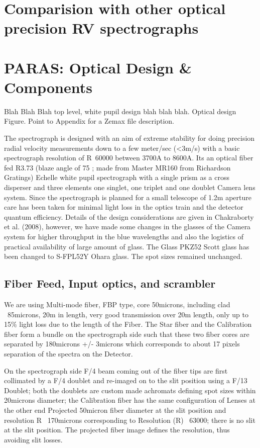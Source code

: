 \documentclass[12pt,preprint]{emulateapj}
\begin{document}
\section{Comparision with other optical precision RV spectrographs}
\section{PARAS: Optical Design \& Components}
\label{optdesign}
Blah Blah Blah top level, white pupil design blah blah blah. Optical design Figure. Point to Appendix for a Zemax file description.

The spectrograph is designed with an aim of extreme stability for doing precision radial velocity measurements
down to a few meter/sec (<3m/s) with a basic spectrograph resolution of R~60000 between 3700A to 8600A. Its an
optical fiber fed R3.73 (blaze angle of 75 ; made from Master MR160 from Richardson Gratings) Echelle white pupil
spectrograph with a single prism as a cross disperser and three elements one singlet, one triplet and one doublet
Camera lens system. Since the spectrograph is planned for a small telescope of 1.2m aperture care has been taken
for minimal light loss in the optics train and the detector quantum efficiency. Details of the design
considerations are given in Chakraborty et al. (2008), however, we have made some changes in the glasses of the
Camera system for higher throughput in the blue wavelengths and also the logistics of practical availability of
large amount of glass. The Glass PKZ52 Scott glass has been changed to S-FPL52Y Ohara glass. The spot sizes
remained unchanged.

\subsection{Fiber Feed, Input optics, and scrambler}
We are using Multi-mode fiber, FBP type, core 50microns, including clad ~85microns, 20m in length, very good
transmission over 20m length, only up to 15\% light loss due to the length of the Fiber. The Star fiber and the
Calibration fiber form a bundle on the spectrograph side such that these two fiber cores are separated by
180microns +/- 3microns which corresponds to about 17 pixels separation of the spectra on the Detector.

On the spectrograph side F/4 beam coming out of the fiber tips are first collimated by a F/4 doublet and
re-imaged on to the slit position using a F/13 Doublet; both the doublets are custom made achromats defining
spot sizes within 20microns diameter; the Calibration fiber has the same configuration of Lenses at the other end
Projected 50micron fiber diameter at the slit position and resolution R ~170microns corresponding to
Resolution (R) ~63000; there is no slit at the slit position. The projected fiber image defines the resolution,
thus avoiding slit losses.
\end{document}
